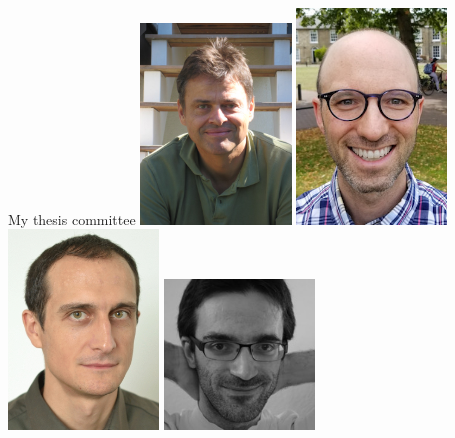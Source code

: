 \documentclass[10pt]{beamer}
\newenvironment{slide}[2][]
  {\begin{frame}[fragile,environment=slide,#1]{#2}}
  {\end{frame}}
\begin{document}
\begin{slide}{My thesis committee}
\includegraphics[width=0.3\textwidth]{figures/martin.jpg}
\includegraphics[width=0.3\textwidth]{figures/richard-eisenberg.jpg}\\
\includegraphics[width=0.3\textwidth]{figures/viktor.jpg}
\includegraphics[width=0.3\textwidth]{figures/paolo.jpg}
\end{slide}
\end{document}

